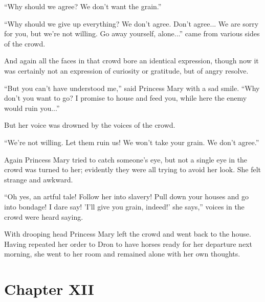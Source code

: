 ``Why should we agree? We don't want the grain.''

``Why should we give up everything? We don't agree. Don't
agree... We are sorry for you, but we're not willing. Go away
yourself, alone...''  came from various sides of the crowd.

And again all the faces in that crowd bore an identical
expression, though now it was certainly not an expression of
curiosity or gratitude, but of angry resolve.

``But you can't have understood me,'' said Princess Mary with a
sad smile.  ``Why don't you want to go? I promise to house and
feed you, while here the enemy would ruin you...''

But her voice was drowned by the voices of the crowd.

``We're not willing. Let them ruin us! We won't take your
grain. We don't agree.''

Again Princess Mary tried to catch someone's eye, but not a
single eye in the crowd was turned to her; evidently they were
all trying to avoid her look. She felt strange and awkward.

``Oh yes, an artful tale! Follow her into slavery! Pull down your
houses and go into bondage! I dare say! 'I'll give you grain,
indeed!' she says,'' voices in the crowd were heard saying.

With drooping head Princess Mary left the crowd and went back to
the house. Having repeated her order to Dron to have horses ready
for her departure next morning, she went to her room and remained
alone with her own thoughts.


\chapter*{Chapter XII} \ifaudio {}
\fi

